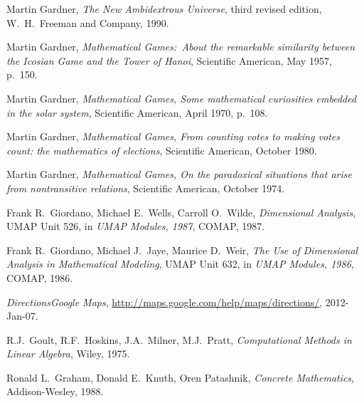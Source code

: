 \begin{thebibliography}{\makebox[2em][c]{{}\hfil{}}}

  Martin Gardner,
  \emph{The New Ambidextrous Universe},
  third revised edition,
  W.\ H.\ Freeman and Company,
  1990.

 Martin Gardner,
 \emph{Mathematical Games:~About the remarkable similarity between
   the Icosian Game and the Tower of Hanoi},
 Scientific American,
 May 1957,
 p.~150. 

  Martin Gardner,
  \emph{Mathematical Games, Some mathematical curiosities embedded in the
        solar system},
  Scientific American,
  April 1970,
  p.~108.

  Martin Gardner,
  \emph{Mathematical Games, From counting votes to making votes count:
        the mathematics of elections},
  Scientific American,
  October 1980.

  Martin Gardner,
  \emph{Mathematical Games, On the paradoxical situations that arise from
        nontransitive relations},
  Scientific American,
  October 1974.

  Frank R.~Giordano,  Michael E.~Wells, Carroll O.~Wilde,
  \emph{Dimensional Analysis}, 
  UMAP Unit 526,
  in
  \emph{UMAP Modules, 1987},
  COMAP,
  1987.

  Frank R.~Giordano,  Michael J.~Jaye, Maurice D.~Weir,
  \emph{The Use of Dimensional Analysis in Mathematical Modeling}, 
  UMAP Unit 632,
  in
  \emph{UMAP Modules, 1986},
  COMAP,
  1986.


  \emph{Directions\Dash Google Maps},
  \url{http://maps.google.com/help/maps/directions/},
  2012-Jan-07.

  R.J.~Goult, R.F.~Hoskins, J.A.~Milner, M.J.~Pratt,
  \emph{Computational Methods in Linear Algebra},
  Wiley,
  1975.

 Ronald L.~Graham, Donald E.~Knuth, Oren Patashnik,
 \emph{Concrete Mathematics},
 Addison-Wesley,
 1988.


\end{thebibliography}
